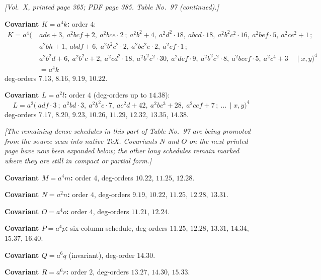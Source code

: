 \documentclass[11pt]{article}
\begin{document}
\newpage

\noindent\textit{[Vol.~X, printed page 365; PDF page 385. Table No.~97 (continued).]}

\medskip

\noindent\textbf{Covariant $K=a^{4}k$:} order $4$:
\begin{align*}
K=a^{4}\bigl(\ &ade+3,\ a^{2}bcf+2,\ a^{2}bce\cdot 2\ ;\ a^{2}b^{2}+4,\ a^{2}d^{2}\cdot 18,\ abcd\cdot 18,\ a^{2}b^{2}c^{2}\cdot 16,\ a^{2}bef\cdot 5,\ a^{2}ce^{2}+1\,;\\
 &a^{2}bh+1,\ abdf+6,\ a^{2}b^{2}c^{2}\cdot 2,\ a^{2}bc^{2}e\cdot 2,\ a^{2}ef\cdot 1\,;\\
 &a^{2}b^{2}d+6,\ a^{2}b^{2}c+2,\ a^{2}cd^{2}\cdot 18,\ a^{2}b^{2}c^{2}\cdot 30,\ a^{2}def\cdot 9,\ a^{2}b^{2}c^{2}\cdot 8,\ a^{2}bcef\cdot 5,\ a^{2}c^{4}+3 \quad\mid x,y\bigr)^{4}\\
 &= a^{4}k
\end{align*}
deg-orders $7.13$, $8.16$, $9.19$, $10.22$.

\medskip

\noindent\textbf{Covariant $L=a^{2}l$:} order $4$ (deg-orders up to $14.38$):
\[
L=a^{2}\bigl(\ adf\cdot 3\ ;\ a^{2}bd\cdot 3,\ a^{2}b^{2}c\cdot 7,\ ac^{2}d+42,\ a^{2}bc^{3}+28,\ a^{2}cef+7\,;\ \ldots\,\mid x,y\bigr)^{4}
\]
deg-orders $7.17$, $8.20$, $9.23$, $10.26$, $11.29$, $12.32$, $13.35$, $14.38$.

\medskip

\textit{[The remaining dense schedules in this part of Table No.~97 are being promoted from the source scan into native TeX.  Covariants $N$ and $O$ on the next printed page have now been expanded below; the other long schedules remain marked where they are still in compact or partial form.]}

\medskip

\noindent\textbf{Covariant $M=a^{4}m$:} order $4$, deg-orders $10.22$, $11.25$, $12.28$.

\noindent\textbf{Covariant $N=a^{2}n$:} order $4$, deg-orders $9.19$, $10.22$, $11.25$, $12.28$, $13.31$.

\noindent\textbf{Covariant $O=a^{4}o$:} order $4$, deg-orders $11.21$, $12.24$.

\noindent\textbf{Covariant $P=a^{4}p$:} six-column schedule, deg-orders $11.25$, $12.28$, $13.31$, $14.34$, $15.37$, $16.40$.

\noindent\textbf{Covariant $Q=a^{6}q$} (invariant), deg-order $14.30$.

\noindent\textbf{Covariant $R=a^{6}r$:} order $2$, deg-orders $13.27$, $14.30$, $15.33$.
\end{document}

